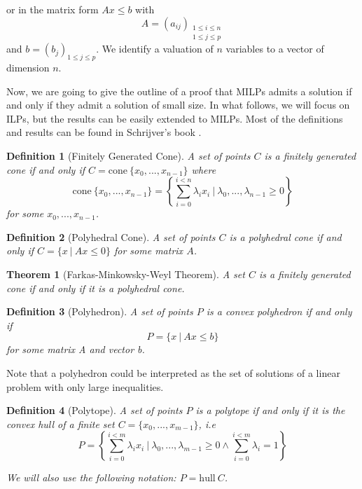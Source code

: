 \documentclass{article}
\newcommand{\cone}{\mathrm{cone}}
\newcommand{\hull}{\mathrm{hull}}
\newcommand{\ifff}{if and only if}
\newtheorem{definition}{Definition}
\newtheorem{theorem}{Theorem}
\begin{document}
or in the matrix form $Ax \leqslant b$ with
$$A = (a_{ij})_{\substack{1 \leqslant i \leqslant n \\
                          1 \leqslant j \leqslant p}}$$ and
$b = (b_j)_{1 \leqslant j \leqslant p}$. We identify a valuation of $n$
variables to a vector of dimension $n$.

Now, we are going to give the outline of a proof that MILPs admits a solution
if and only if they admit a solution of small size. In what follows, we will
focus on ILPs, but the results can be easily extended to MILPs. Most of the
definitions and results can be found in Schrijver's book
\cite[Sections 7 and 16]{Schrijver1998}.

\begin{definition}[Finitely Generated Cone]
  A set of points $C$ is a \textup{finitely generated cone}
  \ifff{} $C = \cone~\{x_0, ..., x_{n-1}\}$ where
  $$\cone~\{x_0, ..., x_{n-1}\} =
      \left\{\sum_{i=0}^{i<n} \lambda_i x_i~|~
               \lambda_0, ..., \lambda_{n-1} \geqslant 0\right\}
  $$
  for some $x_0, ..., x_{n-1}$.
\end{definition}

\begin{definition}[Polyhedral Cone]
  A set of points $C$ is a \textup{polyhedral cone}
  \ifff{} $C = \{x~|~Ax \leqslant 0\}$ for some matrix $A$.
\end{definition}

\begin{theorem}[Farkas-Minkowsky-Weyl Theorem]
  A set $C$ is a finitely generated cone \ifff{} it is a polyhedral cone.
\end{theorem}

\begin{definition}[Polyhedron]
  A set of points $P$ is a \textup{convex polyhedron} \ifff{}
  $$P = \{x~|~Ax \leqslant b\}$$
  for some matrix A and vector b.
\end{definition}

Note that a polyhedron could be interpreted as the set of solutions of a linear
problem with only large inequalities.

\begin{definition}[Polytope]
  A set of points $P$ is a \textup{polytope} \ifff{} it is the convex hull of a
  finite set $C = \{x_0, ..., x_{m-1}\}$, \textit{i.e}
  $$P = \left\{
    \sum_{i=0}^{i<m} \lambda_i x_i~|~\lambda_0, ..., \lambda_{m-1} \geqslant 0
                                  \wedge \sum_{i=0}^{i<m} \lambda_i = 1
        \right\}$$

  We will also use the following notation: $P = \hull~C$.
\end{definition}
\end{document}
